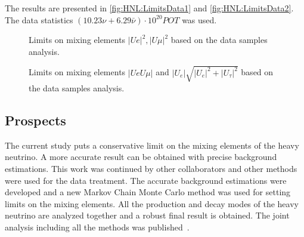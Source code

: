 \documentclass[../main.tex]{subfiles}
\begin{document}
The results are presented in \autoref{fig:HNL:LimitsData1} and \autoref{fig:HNL:LimitsData2}. The data statistics $\left(10.23\nu+6.29\bar{\nu}\right)\cdot 10^{20}POT$ was used.

\begin{figure}[!ht]
    \begin{center}
  \begin{minipage}{0.49\linewidth}
  \end{minipage}
  \hfill
  \begin{minipage}{0.49\linewidth}
  \end{minipage}
  \caption{Limits on mixing elements $\left|Ue\right|^2, \left|U\mu\right|^2$ based on the data samples analysis.}
  \label{fig:HNL:LimitsData1}
    \end{center}
\end{figure}

\begin{figure}[!ht]
    \begin{center}
  \begin{minipage}{0.49\linewidth}
  \end{minipage}
  \begin{minipage}{0.49\linewidth}
  \end{minipage}
  \caption{Limits on mixing elements $\left|UeU\mu\right|$ and $\left|U_{e}\right|\sqrt{\left|U_{e}\right|^2+\left|U_{\tau}\right|^2}$ based on the data samples analysis.}
  \label{fig:HNL:LimitsData2}
  \end{center}
\end{figure}

\subsection{Prospects}
\label{sec:HNL:prosp}
The current study puts a conservative limit on the mixing elements of the heavy neutrino. A more accurate result can be obtained with precise background estimations. This work was continued by other collaborators and other methods were used for the data treatment. The accurate background estimations were developed and a new Markov Chain Monte Carlo method was used for setting limits on the mixing elements. All the production and decay modes of the heavy neutrino are analyzed together and a robust final result is obtained. The joint analysis including all the methods was published~\cite{Abe2019l}.
\end{document}
